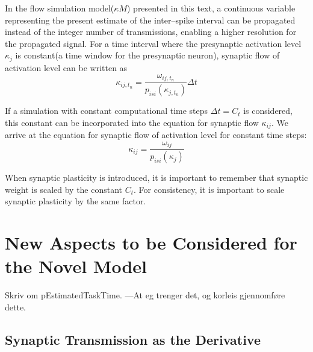 	In the flow simulation model($\kappa M$) presented in this text, a continuous variable representing the present estimate of the inter--spike interval can be propagated instead of the integer number of transmissions,
		enabling a higher resolution for the propagated signal.
	For a time interval where the presynaptic activation level $\kappa_j$ is constant(a time window for the presynaptic neuron), synaptic flow of activation level can be written as
	\begin{equation}
		\kappa_{ij, t_n} = \frac{ \omega_{ij, t_n} }{ p_{isi}(\kappa_{j, t_n}) } \Delta t %
	\end{equation}

	If a simulation with constant computational time steps $\Delta t = C_t$ is considered, this constant can be incorporated into the equation for synaptic flow $\kappa_{ij}$.
	We arrive at the equation for synaptic flow of activation level for constant time steps:
	\begin{equation}
		\kappa_{ij} = \frac{ \omega_{ij} }{ p_{isi}(\kappa_{j})}
		\label{eqSynapticTransmissionForKANN}
	\end{equation}
	
	When synaptic plasticity is introduced, it is important to remember that synaptic weight is scaled by the constant $C_t$.
	For consistency, it is important to scale synaptic plasticity by the same factor.




	\section{New Aspects to be Considered for the Novel Model}
		Skriv om pEstimatedTaskTime. ---At eg trenger det, og korleis gjennomføre dette.
		\subsection{Synaptic Transmission as the Derivative}
